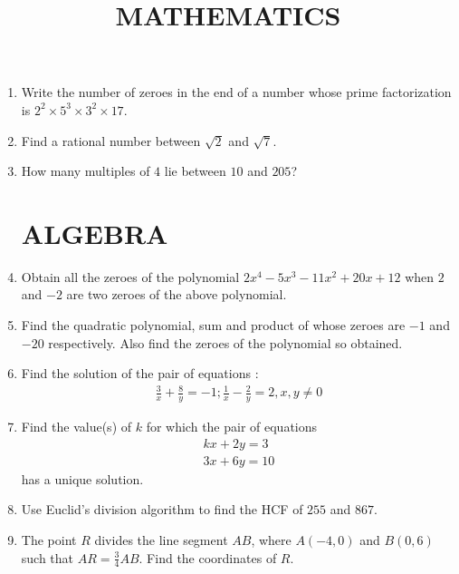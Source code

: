 \documentclass[2pt,-letter paper]{article}
\title{MATHEMATICS }
\providecommand{\brak}[1]{\ensuremath{\left(#1\right)}}
\begin{document}
\maketitle
\begin{enumerate}

\section{NUMBER SYSTEMS}

\item Write the number of zeroes in the end of a number whose prime factorization is $2^2 \times 5^3 \times 3^2 \times 17$.

\item Find a rational number between  $\sqrt2$ and $\sqrt7$.

\item How many multiples of $4$ lie between $10$ and $205$?

\section{ALGEBRA}

\item Obtain all the zeroes of the polynomial $2x^4 - 5x^3 - 11x^2 + 20x + 12$ when $ 2 $ and $ -2 $ are two zeroes of the above polynomial. 

\item Find the quadratic polynomial, sum and product of whose zeroes are $-1$ and $-20$ respectively. Also find the zeroes of the polynomial so obtained.

\item Find the solution of the pair of equations :
\begin{align*}
    \frac{3}{x}+\frac{8}{y}=-1; \frac{1}{x}-\frac{2}{y}=2, x, y\neq 0
\end{align*}

\item Find the value(s) of $k$ for which the pair of equations
\begin{align*}
    kx+2y=3\\
3x+6y=10
\end{align*}
has a unique solution.

 \item Use Euclid's division algorithm to find the HCF of $255$ and $867$.
 \item The point $R$ divides the line segment $AB$, where $A\brak{- 4, 0}$ and $B\brak{0, 6}$ such that $AR=\frac{3}{4} AB$. Find the coordinates of $R$.


\end{enumerate}
\end{document}
